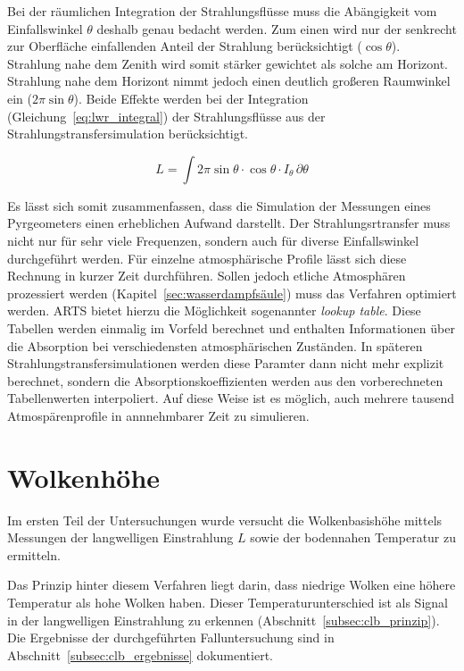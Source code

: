 \documentclass[10pt,a4paper,compsoc,peer review papers]{IEEEtran}
\begin{document}
Bei der räumlichen Integration der Strahlungsflüsse muss die Abängigkeit vom
Einfallswinkel $\theta$ deshalb genau bedacht werden. Zum einen wird nur der
senkrecht zur Oberfläche einfallenden Anteil der Strahlung berücksichtigt
($\cos\theta$). Strahlung nahe dem Zenith wird somit stärker gewichtet als
solche am Horizont. Strahlung nahe dem Horizont nimmt jedoch einen deutlich
großeren Raumwinkel ein ($2\pi\sin\theta$). Beide Effekte werden bei der
Integration (Gleichung~\ref{eq:lwr_integral}) der Strahlungsflüsse aus der
Strahlungstransfersimulation berücksichtigt.

\begin{equation}\label{eq:lwr_integral}
    L = \int 2\pi \sin\theta \cdot \cos\theta \cdot I_\theta \,\partial\theta
\end{equation}

Es lässt sich somit zusammenfassen, dass die Simulation der Messungen eines
Pyrgeometers einen erheblichen Aufwand darstellt. Der Strahlungsrtransfer muss
nicht nur für sehr viele Frequenzen, sondern auch für diverse Einfallswinkel
durchgeführt werden. Für einzelne atmosphärische Profile lässt sich diese
Rechnung in kurzer Zeit durchführen. Sollen jedoch etliche Atmosphären
prozessiert werden (Kapitel~\ref{sec:wasserdampfsäule}) muss das Verfahren
optimiert werden. ARTS bietet hierzu die Möglichkeit sogenannter
\textit{lookup table}. Diese Tabellen werden einmalig im Vorfeld berechnet
und enthalten Informationen über die Absorption bei verschiedensten
atmosphärischen Zuständen. In späteren Strahlungstransfersimulationen werden
diese Paramter dann nicht mehr explizit berechnet, sondern die
Absorptionskoeffizienten werden aus den vorberechneten Tabellenwerten
interpoliert. Auf diese Weise ist es möglich, auch mehrere tausend
Atmospärenprofile in annnehmbarer Zeit zu simulieren.

\section{Wolkenhöhe}\label{sec:wolkenhoehe}
Im ersten Teil der Untersuchungen wurde versucht die Wolkenbasishöhe mittels
Messungen der langwelligen Einstrahlung $L$ sowie der bodennahen Temperatur
zu ermitteln.

Das Prinzip hinter diesem Verfahren liegt darin, dass niedrige Wolken eine
höhere Temperatur als hohe Wolken haben. Dieser Temperaturunterschied ist als
Signal in der langwelligen Einstrahlung zu erkennen
(Abschnitt~\ref{subsec:clb_prinzip}). Die Ergebnisse der durchgeführten
Falluntersuchung sind in Abschnitt~\ref{subsec:clb_ergebnisse} dokumentiert.
\end{document}
